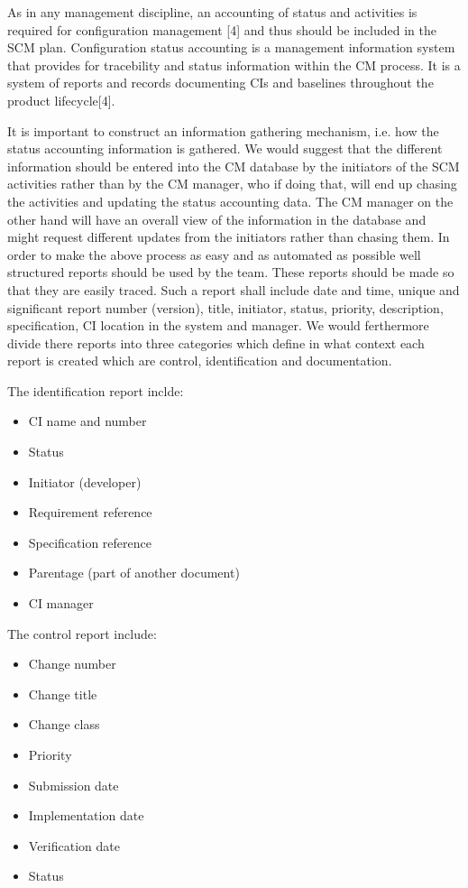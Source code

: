 \documentclass[a4paper]{article}
\begin{document}
As in any management discipline, an accounting of status and activities is required for configuration management [4] and thus should be included in the SCM plan. Configuration status accounting is a management information system that provides for tracebility and status information within the CM process. It is a system of reports and records documenting CIs and baselines throughout the product lifecycle[4]. 

It is important to construct an information gathering mechanism, i.e. how the status accounting information is gathered. We would suggest that the different information should be entered into the CM database by the initiators of the SCM activities rather than by the CM manager, who if doing that, will end up chasing the activities and updating the status accounting data. The CM manager on the other hand will have an overall view of the information in the database and might request different updates from the initiators rather than chasing them. In order to make the above process as easy and as automated as possible well structured reports should be used by the team. These reports should be made so that they are easily traced. Such a report shall include date and time, unique and significant report number (version), title, initiator, status, priority, description, specification, CI location in the system and manager. We would ferthermore divide there reports into three categories which define in what context each report is created which are control, identification and documentation.

The identification report inclde:
\begin{itemize}
  \item CI name and number
  \item Status
  \item Initiator (developer)
  \item Requirement reference
  \item Specification reference
  \item Parentage (part of another document)
  \item CI manager
\end{itemize}

The control report include:
\begin{itemize}
  \item Change number
  \item Change title
  \item Change class
  \item Priority
  \item Submission date
  \item Implementation date
  \item Verification date
  \item Status
\end{itemize}
\end{document}
